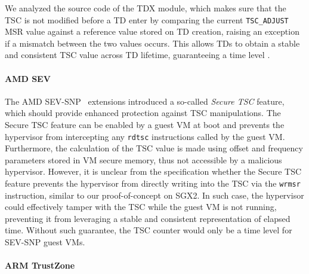 \documentclass[sigplan,10pt]{acmart}
\newcommand{\inst}[1]{\texttt{\lowercase{#1}}}
\begin{document}
We analyzed the source code of the TDX module, which makes sure that the
\ac{TSC} is not modified before a \ac{TD} enter
%
%
by comparing the current \texttt{TSC\_ADJUST} \ac{MSR} value against a reference
value stored on \ac{TD} creation, raising an exception if a mismatch between the
two values occurs.
%
%
This allows \acp{TD} to obtain a stable and consistent \ac{TSC} value across
\ac{TD} lifetime, guaranteeing a time level \Tthree{}.

\paragraph{AMD SEV}

The AMD SEV-SNP~\cite{AmdSevSnp} extensions introduced a so-called \emph{Secure
\ac{TSC}} feature, which should provide enhanced protection against \ac{TSC}
manipulations. The Secure \ac{TSC} feature can be enabled by a guest VM at boot
and prevents the hypervisor from intercepting any \inst{RDTSC} instructions
called by the guest VM. Furthermore, the calculation of the \ac{TSC} value is
made using offset and frequency parameters stored in VM secure memory, thus not
accessible by a malicious hypervisor. However, it is unclear from the
specification whether the Secure \ac{TSC} feature prevents the hypervisor from
directly writing into the \ac{TSC} via the \inst{wrmsr} instruction, similar to
our proof-of-concept on SGX2. In such case, the hypervisor could effectively
tamper with the \ac{TSC} while the guest VM is not running, preventing it from
leveraging a stable and consistent representation of elapsed time. Without such
guarantee, the \ac{TSC} counter would only be a \Tzero time level for SEV-SNP
guest VMs.

\paragraph{ARM TrustZone}
\end{document}
